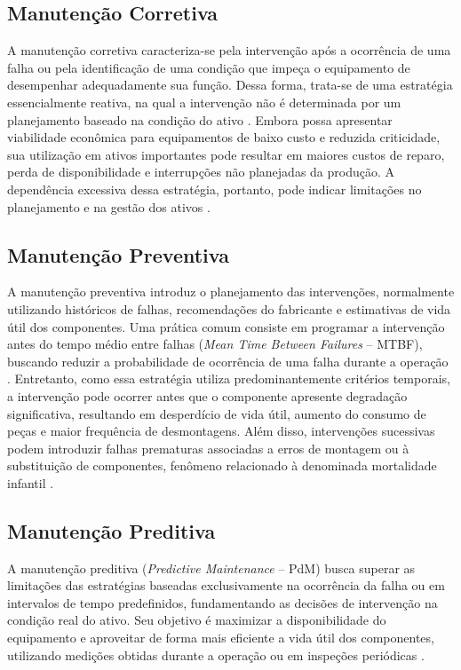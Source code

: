 \documentclass[conference]{IEEEtran}
\begin{document}
\subsection{Manutenção Corretiva}

A manutenção corretiva caracteriza-se pela intervenção após a ocorrência de uma falha ou pela identificação de uma condição que impeça o equipamento de desempenhar adequadamente sua função. Dessa forma, trata-se de uma estratégia essencialmente reativa, na qual a intervenção não é determinada por um planejamento baseado na condição do ativo \cite{deac2010modern}. Embora possa apresentar viabilidade econômica para equipamentos de baixo custo e reduzida criticidade, sua utilização em ativos importantes pode resultar em maiores custos de reparo, perda de disponibilidade e interrupções não planejadas da produção. A dependência excessiva dessa estratégia, portanto, pode indicar limitações no planejamento e na gestão dos ativos \cite{girdhar2004practical}.

\subsection{Manutenção Preventiva}

A manutenção preventiva introduz o planejamento das intervenções, normalmente utilizando históricos de falhas, recomendações do fabricante e estimativas de vida útil dos componentes. Uma prática comum consiste em programar a intervenção antes do tempo médio entre falhas (\textit{Mean Time Between Failures} -- MTBF), buscando reduzir a probabilidade de ocorrência de uma falha durante a operação \cite{girdhar2004practical,randall2011vibration}. Entretanto, como essa estratégia utiliza predominantemente critérios temporais, a intervenção pode ocorrer antes que o componente apresente degradação significativa, resultando em desperdício de vida útil, aumento do consumo de peças e maior frequência de desmontagens. Além disso, intervenções sucessivas podem introduzir falhas prematuras associadas a erros de montagem ou à substituição de componentes, fenômeno relacionado à denominada mortalidade infantil \cite{randall2011vibration}.

\subsection{Manutenção Preditiva}

A manutenção preditiva (\textit{Predictive Maintenance} -- PdM) busca superar as limitações das estratégias baseadas exclusivamente na ocorrência da falha ou em intervalos de tempo predefinidos, fundamentando as decisões de intervenção na condição real do ativo. Seu objetivo é maximizar a disponibilidade do equipamento e aproveitar de forma mais eficiente a vida útil dos componentes, utilizando medições obtidas durante a operação ou em inspeções periódicas \cite{girdhar2004practical,randall2011vibration}.
\end{document}
